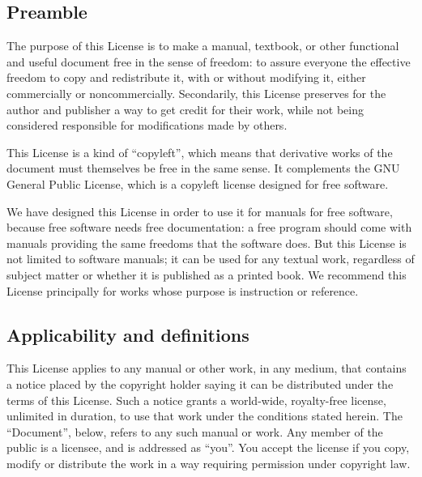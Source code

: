 \subsection*{{\tiny{}Preamble}}

{\tiny{}The purpose of this License is to make a manual, textbook,
or other functional and useful document free in the sense of freedom:
to assure everyone the effective freedom to copy and redistribute
it, with or without modifying it, either commercially or noncommercially.
Secondarily, this License preserves for the author and publisher a
way to get credit for their work, while not being considered responsible
for modifications made by others.}{\tiny\par}

{\tiny{}This License is a kind of \textquotedblleft copyleft'', which
means that derivative works of the document must themselves be free
in the same sense. It complements the GNU General Public License,
which is a copyleft license designed for free software.}{\tiny\par}

{\tiny{}We have designed this License in order to use it for manuals
for free software, because free software needs free documentation:
a free program should come with manuals providing the same freedoms
that the software does. But this License is not limited to software
manuals; it can be used for any textual work, regardless of subject
matter or whether it is published as a printed book. We recommend
this License principally for works whose purpose is instruction or
reference.}{\tiny\par}

\subsection{Applicability and definitions\label{subsec:1Applicability-and-definitions}}

{\tiny{}This License applies to any manual or other work, in any medium,
that contains a notice placed by the copyright holder saying it can
be distributed under the terms of this License. Such a notice grants
a world-wide, royalty-free license, unlimited in duration, to use
that work under the conditions stated herein. The \textquotedblleft Document'',
below, refers to any such manual or work. Any member of the public
is a licensee, and is addressed as \textquotedblleft you''. You accept
the license if you copy, modify or distribute the work in a way requiring
permission under copyright law.}{\tiny\par}

